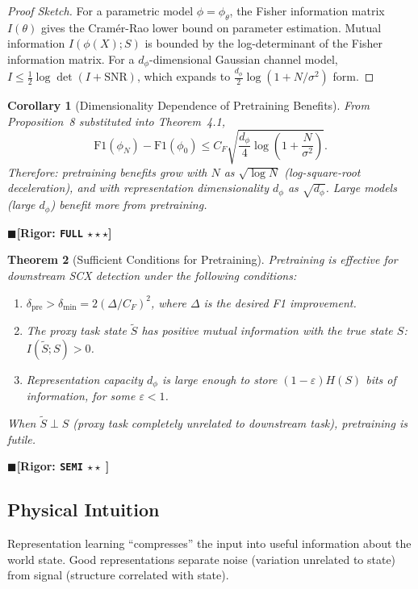 \documentclass[12pt,a4paper]{article}
\newtheorem{theorem}{Theorem}[section]
\newtheorem{corollary}[theorem]{Corollary}
\theoremstyle{definition}
\theoremstyle{remark}
\newcommand{\rigorFull}{$\blacksquare$\;\textbf{[Rigor: \texttt{FULL} $\star\star\star$]}}
\newcommand{\rigorSemi}{$\blacksquare$\;\textbf{[Rigor: \texttt{SEMI} $\star\star\;$]}}
\begin{document}
\begin{proof}[Proof Sketch]
For a parametric model $\phi = \phi_\theta$, the Fisher information matrix $I(\theta)$ gives the Cram\'{e}r-Rao lower bound on parameter estimation. Mutual information $I(\phi(X); S)$ is bounded by the log-determinant of the Fisher information matrix. For a $d_\phi$-dimensional Gaussian channel model, $I \leq \frac{1}{2}\log\det(I + \text{SNR})$, which expands to $\frac{d_\phi}{2}\log(1 + N/\sigma^2)$ form.
\end{proof}

\begin{corollary}[Dimensionality Dependence of Pretraining Benefits]
\label{cor:3}
From Proposition~8 substituted into Theorem~4.1,
\begin{equation}
\mathrm{F1}(\phi_N) - \mathrm{F1}(\phi_0) \leq C_F\sqrt{\frac{d_\phi}{4}\log\left(1 + \frac{N}{\sigma^2}\right)}.
\end{equation}
Therefore: pretraining benefits grow with $N$ as $\sqrt{\log N}$ (log-square-root deceleration), and with representation dimensionality $d_\phi$ as $\sqrt{d_\phi}$. Large models (large $d_\phi$) benefit more from pretraining.
\end{corollary}
\rigorFull

\begin{theorem}[Sufficient Conditions for Pretraining]
\label{thm:4.2}
Pretraining is effective for downstream SCX detection under the following conditions:
\begin{enumerate}[label=\arabic*.]
\item $\delta_{\text{pre}} > \delta_{\min} = 2(\Delta/C_F)^2$, where $\Delta$ is the desired F1 improvement.
\item The proxy task state $\tilde{S}$ has positive mutual information with the true state $S$: $I(\tilde{S}; S) > 0$.
\item Representation capacity $d_\phi$ is large enough to store $(1-\varepsilon)H(S)$ bits of information, for some $\varepsilon < 1$.
\end{enumerate}
When $\tilde{S} \perp S$ (proxy task completely unrelated to downstream task), pretraining is futile.
\end{theorem}
\rigorSemi

\subsection{Physical Intuition}
Representation learning ``compresses'' the input into useful information about the world state. Good representations separate noise (variation unrelated to state) from signal (structure correlated with state).
\end{document}
